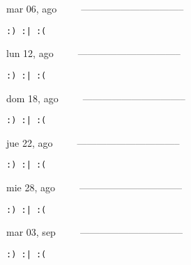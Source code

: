 \documentclass[letterpaper,10pt]{article}
\begin{document}
\begin{multicols}{3}
{mar 06, ago\ \ \ \ \ --------------------------------}
\begin{flushright}\begin{small}\texttt{:) :| :(}\end{small}\end{flushright}
\vfill
{lun 12, ago\ \ \ \ \ --------------------------------}
\begin{flushright}\begin{small}\texttt{:) :| :(}\end{small}\end{flushright}\par
\vfill
{dom 18, ago\ \ \ \ \ --------------------------------}
\begin{flushright}\begin{small}\texttt{:) :| :(}\end{small}\end{flushright}\par
\vfill
\end{multicols}
\vspace{1.05cm}

\begin{multicols}{3}
{jue 22, ago\ \ \ \ \ --------------------------------}
\begin{flushright}\begin{small}\texttt{:) :| :(}\end{small}\end{flushright}
\vfill
{mie 28, ago\ \ \ \ \ --------------------------------}
\begin{flushright}\begin{small}\texttt{:) :| :(}\end{small}\end{flushright}\par
\vfill
{mar 03, sep\ \ \ \ \ --------------------------------}
\begin{flushright}\begin{small}\texttt{:) :| :(}\end{small}\end{flushright}\par
\vfill
\end{multicols}
\vspace{1.05cm}
\end{document}
